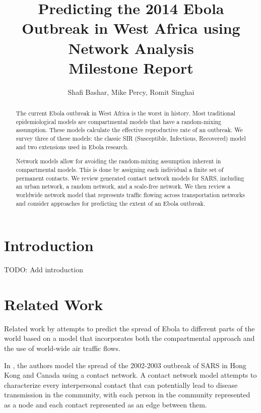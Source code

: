 \documentclass[10pt, journal,onecolumn]{IEEEtran}
\title{Predicting the 2014 Ebola Outbreak in West Africa using Network Analysis \\
       {\large Milestone Report} }
\author{Shafi Bashar, Mike Percy, Romit  Singhai}
\affil{\textit {\{shafiab, mp81, romit\}@stanford.edu}}
\begin{document}
\maketitle

\begin{abstract}
The current Ebola outbreak in West Africa is the worst in history.
Most traditional epidemiological models are compartmental models that have a random-mixing
assumption. These models calculate the
effective reproductive rate of an outbreak. We survey three of these models: the classic
SIR (Susceptible, Infectious, Recovered) model and two extensions used in Ebola research.

Network models allow for avoiding the random-mixing
assumption inherent in compartmental models.
This is done by assigning each individual a finite set of permanent contacts.
We review generated contact network models for SARS, including an urban network, a random network, and
a scale-free network.
We then review a worldwide network model that represents traffic flowing across transportation
networks and consider approaches for predicting the extent of an Ebola outbreak.

\end{abstract}




\section{Introduction}
\label{sec:Introduction}

TODO: Add introduction




\section{Related Work}
\label{sec:RelatedWork}

Related work by \citep{gomes2014assessing} attempts to predict the spread of Ebola
to different parts of the world based on a model that incorporates both the compartmental
approach and the use of world-wide air traffic flows.

In \citep{meyers2005network}, the authors model the spread of the 2002-2003
outbreak of SARS in Hong Kong and Canada using a contact network.
A contact network model attempts to characterize every interpersonal contact that can
potentially lead to disease transmission in the community, with each person in the
community represented as a node and each contact represented as an edge between them.
\end{document}
